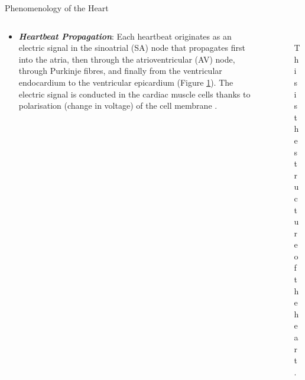 \documentclass[final,hyperref={pdfpagelabels=false}]{beamer}
\begin{document}
\begin{frame}[t]
\begin{columns}[t]
\begin{column}{.465\textwidth}
\begin{block}{Phenomenology of the Heart}
\begin{columns}
\begin{column}{.54\textwidth}
	\begin{itemize}
	\item \textbf{\textit{Heartbeat Propagation}}: Each heartbeat originates as an electric signal in the sinoatrial (SA) node that propagates first into the atria, then through the atrioventricular (AV) node, through Purkinje fibres, and finally from the ventricular endocardium to the ventricular epicardium (Figure \ref{fig:heart}). The electric signal is conducted in the cardiac muscle cells thanks to polarisation (change in voltage) of the cell membrane \cite{Comtois}. 
	\end{itemize}
\end{column}

\begin{column}{.43\textwidth}
	\begin{figure}
	
	
	\includegraphics[width=0.95\textwidth]{heart}
	\caption{\label{fig:heart}This is the structure of the heart.}
	\end{figure}
\end{column}
\end{columns}
\begin{itemize}


\end{itemize}
\end{block}
\end{column}
\end{columns}
\end{frame}
\end{document}
